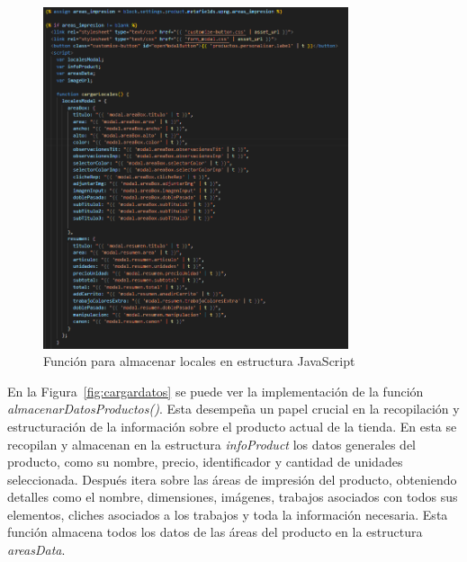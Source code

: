 \documentclass[12pt]{article}
\begin{document}
\begin{figure}[ht]
    \centering
    \includegraphics[width=0.8\textwidth]{imagenesUS3-section/funcioncargarLocales.png}
    \caption{\label{fig:cargarlocales} Función para almacenar locales en estructura JavaScript}
    \vspace{\fill}
\end{figure}

En la Figura~\ref{fig:cargardatos} se puede ver la implementación de la función \textit{almacenarDatosProductos()}. Esta desempeña un papel crucial en 
la recopilación y estructuración de la información sobre el producto actual de la tienda. En esta se recopilan y almacenan en la estructura \textit{infoProduct} los datos generales del producto, como su nombre, precio, identificador y cantidad de
unidades seleccionada. Después itera sobre las áreas de impresión del producto, obteniendo detalles como el nombre, dimensiones, imágenes, trabajos asociados con todos sus elementos, cliches asociados a los trabajos y toda la información necesaria. Esta función
almacena todos los datos de las áreas del producto en la estructura \textit{areasData}.
\end{document}

